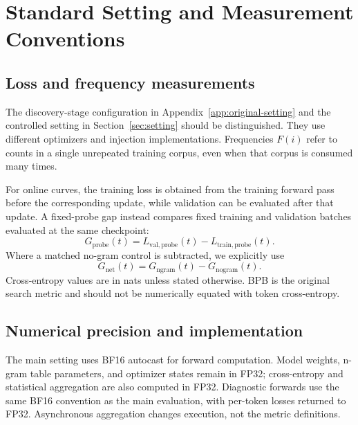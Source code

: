 \section{Standard Setting and Measurement Conventions}
\label{app:setting}

\subsection{Loss and frequency measurements}

The discovery-stage configuration in Appendix~\ref{app:original-setting} and the controlled setting in Section~\ref{sec:setting} should be distinguished. They use different optimizers and injection implementations. Frequencies $F(i)$ refer to counts in a single unrepeated training corpus, even when that corpus is consumed many times.

For online curves, the training loss is obtained from the training forward pass before the corresponding update, while validation can be evaluated after that update. A fixed-probe gap instead compares fixed training and validation batches evaluated at the same checkpoint:
\begin{equation}
 G_{\mathrm{probe}}(t)
 =L_{\mathrm{val,probe}}(t)-L_{\mathrm{train,probe}}(t).
\end{equation}
Where a matched no-gram control is subtracted, we explicitly use
\begin{equation}
 G_{\mathrm{net}}(t)
 =G_{\mathrm{ngram}}(t)-G_{\mathrm{nogram}}(t).
\end{equation}
Cross-entropy values are in nats unless stated otherwise. BPB is the original search metric and should not be numerically equated with token cross-entropy.


\subsection{Numerical precision and implementation}

The main setting uses BF16 autocast for forward computation. Model weights, n-gram table parameters, and optimizer states remain in FP32; cross-entropy and statistical aggregation are also computed in FP32. Diagnostic forwards use the same BF16 convention as the main evaluation, with per-token losses returned to FP32. Asynchronous aggregation changes execution, not the metric definitions.

